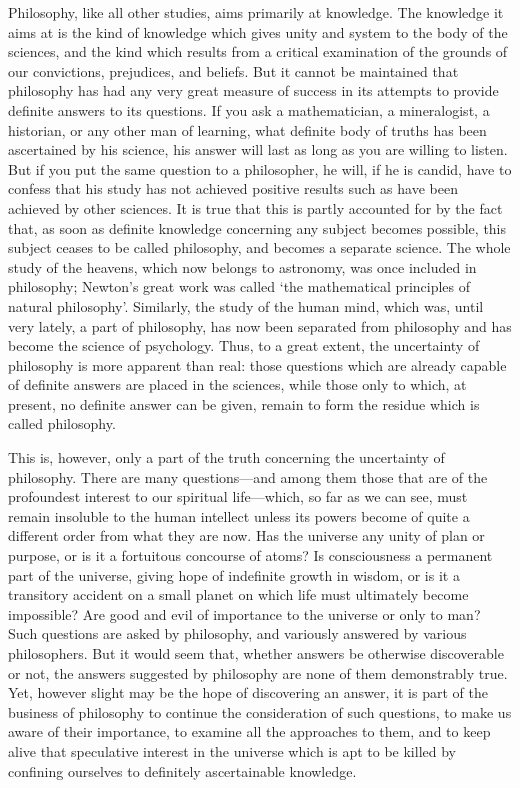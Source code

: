 \documentclass[oneside,letterpaper,12pt]{book}
\begin{document}
Philosophy, like all other studies, aims primarily at knowledge. The
knowledge it aims at is the kind of knowledge which gives unity and
system to the body of the sciences, and the kind which results from a
critical examination of the grounds of our convictions, prejudices, and
beliefs. But it cannot be maintained that philosophy has had any very
great measure of success in its attempts to provide definite answers to
its questions. If you ask a mathematician, a mineralogist, a historian,
or any other man of learning, what definite body of truths has been
ascertained by his science, his answer will last as long as you are
willing to listen. But if you put the same question to a philosopher, he
will, if he is candid, have to confess that his study has not achieved
positive results such as have been achieved by other sciences. It is
true that this is partly accounted for by the fact that, as soon as
definite knowledge concerning any subject becomes possible, this subject
ceases to be called philosophy, and becomes a separate science. The
whole study of the heavens, which now belongs to astronomy, was once
included in philosophy; Newton's great work was called
`the mathematical principles of natural
philosophy'. Similarly, the study of the human mind,
which was, until very lately, a part of philosophy, has now been separated from philosophy
and has become the science of psychology. Thus, to a great extent, the
uncertainty of philosophy is more apparent than real: \label{apparent} those questions
which are already capable of definite answers are placed in the
sciences, while those only to which, at present, no definite answer can
be given, remain to form the residue which is called philosophy.

This is, however, only a part of the truth concerning the uncertainty of
philosophy. There are many questions---and among them those that are of
the profoundest interest to our spiritual life---which, so far as we can
see, must remain insoluble to the human intellect unless its powers
become of quite a different order from what they are now. Has the
universe any unity of plan or purpose, or is it a fortuitous concourse
of atoms? Is consciousness a permanent part of the universe, giving hope
of indefinite growth in wisdom, or is it a transitory accident on a
small planet on which life must ultimately become impossible? Are good
and evil of importance to the universe or only to man? Such questions
are asked by philosophy, and variously answered by various philosophers.
But it would seem that, whether answers be otherwise discoverable or
not, the answers suggested by philosophy are none of them demonstrably
true. Yet, however slight may be the hope of discovering an answer, it
is part of the business of philosophy to continue the consideration of
such questions, to make us aware of their importance, to examine all the
approaches to them, and to keep alive that speculative interest in the
universe which is apt to be killed by confining ourselves to definitely
ascertainable knowledge.
\end{document}
